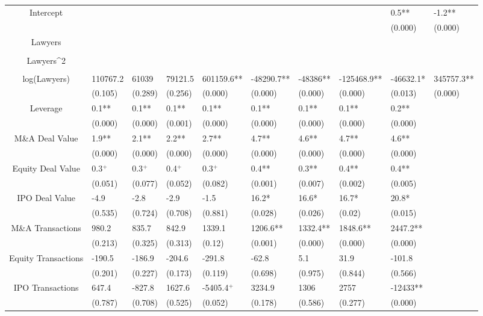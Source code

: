 \documentclass{article}
\begin{document}
\begin{table}[H]
\begin{tabular}{|clllllllll|}
Intercept &  &  &  &  &  &  &  & 0.5** & -1.2** \\ 
   &  &  &  &  &  &  &  & (0.000) & (0.000) \\ 
  Lawyers &  &  &  &  &  &  &  &  &  \\ 
   &  &  &  &  &  &  &  &  &  \\ 
  Lawyers^2 &  &  &  &  &  &  &  &  &  \\ 
   &  &  &  &  &  &  &  &  &  \\ 
  log(Lawyers) & 110767.2 & 61039 & 79121.5 & 601159.6** & -48290.7** & -48386** & -125468.9** & -46632.1* & 345757.3** \\ 
   & (0.105) & (0.289) & (0.256) & (0.000) & (0.000) & (0.000) & (0.000) & (0.013) & (0.000) \\ 
  Leverage & 0.1** & 0.1** & 0.1** & 0.1** & 0.1** & 0.1** & 0.1** & 0.2** &  \\ 
   & (0.000) & (0.000) & (0.001) & (0.000) & (0.000) & (0.000) & (0.000) & (0.000) &  \\ 
  M\&A Deal Value & 1.9** & 2.1** & 2.2** & 2.7** & 4.7** & 4.6** & 4.7** & 4.6** &  \\ 
   & (0.000) & (0.000) & (0.000) & (0.000) & (0.000) & (0.000) & (0.000) & (0.000) &  \\ 
  Equity Deal Value & 0.3$^{+}$ & 0.3$^{+}$ & 0.4$^{+}$ & 0.3$^{+}$ & 0.4** & 0.3** & 0.4** & 0.4** &  \\ 
   & (0.051) & (0.077) & (0.052) & (0.082) & (0.001) & (0.007) & (0.002) & (0.005) &  \\ 
  IPO Deal Value & -4.9 & -2.8 & -2.9 & -1.5 & 16.2* & 16.6* & 16.7* & 20.8* &  \\ 
   & (0.535) & (0.724) & (0.708) & (0.881) & (0.028) & (0.026) & (0.02) & (0.015) &  \\ 
  M\&A Transactions & 980.2 & 835.7 & 842.9 & 1339.1 & 1206.6** & 1332.4** & 1848.6** & 2447.2** &  \\ 
   & (0.213) & (0.325) & (0.313) & (0.12) & (0.001) & (0.000) & (0.000) & (0.000) &  \\ 
  Equity Transactions & -190.5 & -186.9 & -204.6 & -291.8 & -62.8 & 5.1 & 31.9 & -101.8 &  \\ 
   & (0.201) & (0.227) & (0.173) & (0.119) & (0.698) & (0.975) & (0.844) & (0.566) &  \\ 
  IPO Transactions & 647.4 & -827.8 & 1627.6 & -5405.4$^{+}$ & 3234.9 & 1306 & 2757 & -12433** &  \\ 
   & (0.787) & (0.708) & (0.525) & (0.052) & (0.178) & (0.586) & (0.277) & (0.000) &  \\ 

\end{tabular}
\end{table}
\end{document}
